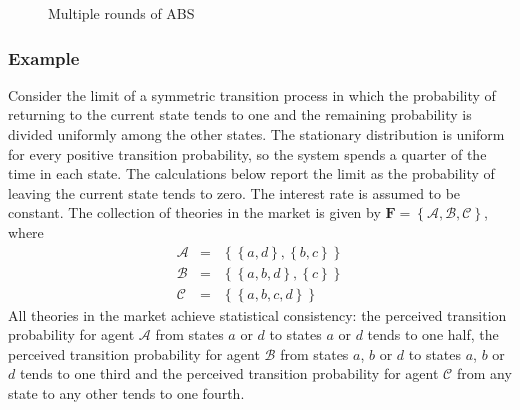 \documentclass[11pt]{article}
\theoremstyle{plain}
\begin{document}
\begin{figure}[h]
\centering
{}
\caption{Multiple rounds of ABS}
\label{fig:mbs}
\end{figure}

\subsubsection{Example}

Consider the limit of a symmetric transition process in which the probability of returning to the current state tends to one and the remaining probability is divided uniformly among the other states. The stationary distribution is uniform for every positive transition probability, so the system spends a quarter of the time in each state. The calculations below report the limit as the probability of leaving the current state tends to zero. The interest rate is assumed to be constant. The collection of theories in the market is given by $\mathbf{F}=\left\{\mathcal{A},\mathcal{B},\mathcal{C}\right\}$, where
\begin{eqnarray*}
\mathcal{A} & = & \left\{\left\{a,d\right\},\left\{b,c\right\}\right\} \\
\mathcal{B} & = & \left\{\left\{a,b,d\right\},\left\{c\right\}\right\} \\
\mathcal{C} & = & \left\{\left\{a,b,c,d\right\}\right\}
\end{eqnarray*}
All theories in the market achieve statistical consistency: the perceived transition probability for agent $\mathcal{A}$ from states $a$ or $d$ to states $a$ or $d$ tends to one half, the perceived transition probability for agent $\mathcal{B}$ from states $a$, $b$ or $d$ to states $a$, $b$ or $d$ tends to one third and the perceived transition probability for agent $\mathcal{C}$ from any state to any other tends to one fourth.
\end{document}
